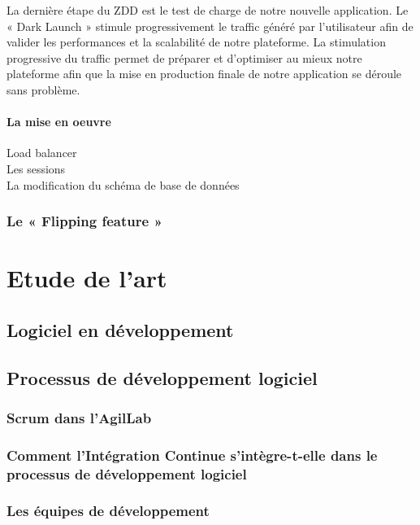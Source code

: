 \documentclass{report}
\begin{document}
          La dernière étape du ZDD est le test de charge de notre nouvelle application. Le « Dark Launch » stimule progressivement le traffic généré par l’utilisateur afin de valider les performances et la scalabilité de notre plateforme. La stimulation progressive du traffic permet de préparer et d’optimiser au mieux notre plateforme afin que la mise en production finale de notre application se déroule sans problème.

          \subsubsection{La mise en oeuvre}
          Load balancer\\

          Les sessions\\

          La modification du schéma de base de données\\

        \subsection{Le « Flipping feature »}

    \chapter{Etude de l'art}

      \section{Logiciel en développement}

      \section{Processus de développement logiciel}

        \subsection{Scrum dans l'AgilLab}

        \subsection{Comment l’Intégration Continue s’intègre-t-elle dans le processus de développement logiciel}

        \subsection{Les équipes de développement}
\end{document}

